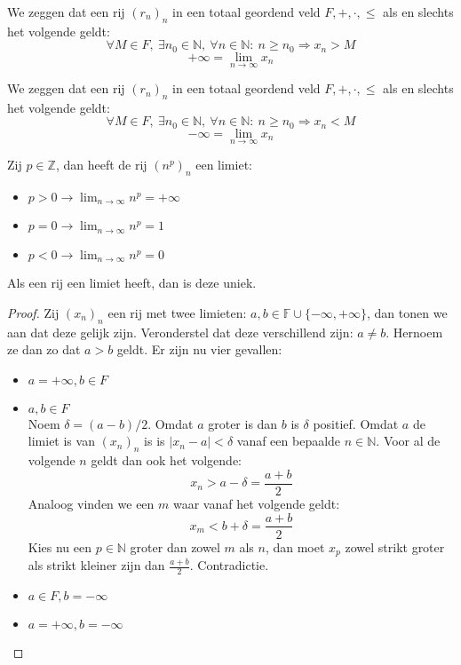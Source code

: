 \documentclass[main.tex]{subfiles}
\begin{document}
\begin{de}
  We zeggen dat een rij $(r_{n})_{n}$ in een totaal geordend veld $F,+,\cdot,\le$  als en slechts het volgende geldt:
  \[ \forall M\in F,\ \exists n_{0}\in \mathbb{N},\ \forall n\in \mathbb{N}:\ n \ge n_{0} \Rightarrow x_{n} > M \]
  \[ + \infty = \lim_{n\rightarrow \infty}x_{n}\]
\end{de}

\begin{de}
  We zeggen dat een rij $(r_{n})_{n}$ in een totaal geordend veld $F,+,\cdot,\le$  als en slechts het volgende geldt:
  \[ \forall M\in F,\ \exists n_{0}\in \mathbb{N},\ \forall n\in \mathbb{N}:\ n \ge n_{0} \Rightarrow x_{n} < M \]
  \[ - \infty = \lim_{n\rightarrow \infty}x_{n}\]
\end{de}


\begin{pr}
  Zij $p\in \mathbb{Z}$, dan heeft de rij $(n^{p})_{n}$ een limiet:
  \begin{itemize}
  \item $p>0 \rightarrow \lim_{n\rightarrow \infty}n^{p} = + \infty$
  \item $p=0 \rightarrow \lim_{n\rightarrow \infty}n^{p} = 1$
  \item $p<0 \rightarrow \lim_{n\rightarrow \infty}n^{p} = 0$
  \end{itemize}
\end{pr}

\begin{pr}
  Als een rij een limiet heeft, dan is deze uniek.

  \begin{proof}
    Zij $(x_{n})_{n}$ een rij met twee limieten: $a,b \in \mathbb{F}\cup \{-\infty,+\infty\}$, dan tonen we aan dat deze gelijk zijn.
    Veronderstel dat deze verschillend zijn: $a \neq b$.
    Hernoem ze dan zo dat $a > b$ geldt.
    Er zijn nu vier gevallen:
    \begin{itemize}
    \item $a = +\infty, b \in F$\\
    \item $a,b\in F$\\
      Noem $\delta = (a-b)/2$.
      Omdat $a$ groter is dan $b$ is $\delta$ positief.
      Omdat $a$ de limiet is van $(x_{n})_{n}$ is is $|x_{n}-a|<\delta$ vanaf een bepaalde $n\in \mathbb{N}$.
      Voor al de volgende $n$ geldt dan ook het volgende:
      \[ x_{n}>a-\delta = \frac{a+b}{2} \]
      Analoog vinden we een $m$ waar vanaf het volgende geldt:
      \[ x_{m}<b+\delta=\frac{a+b}{2} \]
      Kies nu een $p\in \mathbb{N}$ groter dan zowel $m$ als $n$, dan moet $x_{p}$ zowel strikt groter als strikt kleiner zijn dan $\frac{a+b}{2}$.
      Contradictie.
    \item $a\in F, b = -\infty$\\
    \item $a= +\infty, b=-\infty$\\
    \end{itemize}
  \end{proof}
\end{pr}
\end{document}
